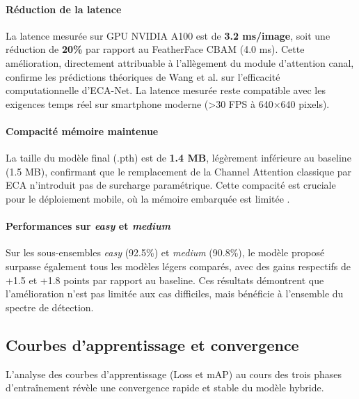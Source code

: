 \begin{onehalfspace}
\paragraph{Réduction de la latence}

\hspace{0.65 cm}La latence mesurée sur GPU NVIDIA A100 est de \textbf{3.2 ms/image}, soit une réduction de \textbf{20\%} par rapport au FeatherFace CBAM (4.0 ms). Cette amélioration, directement attribuable à l'allègement du module d'attention canal, confirme les prédictions théoriques de Wang et al. \cite{Wang2020ECANet} sur l'efficacité computationnelle d'ECA-Net. La latence mesurée reste compatible avec les exigences temps réel sur smartphone moderne (>30 FPS à 640×640 pixels).

\paragraph{Compacité mémoire maintenue}

\hspace{0.65 cm}La taille du modèle final (.pth) est de \textbf{1.4 MB}, légèrement inférieure au baseline (1.5 MB), confirmant que le remplacement de la Channel Attention classique par ECA n'introduit pas de surcharge paramétrique. Cette compacité est cruciale pour le déploiement mobile, où la mémoire embarquée est limitée \cite{Zhang2019BlazeFace}.

\paragraph{Performances sur \textit{easy} et \textit{medium}}

\hspace{0.65 cm}Sur les sous-ensembles \textit{easy} (92.5\%) et \textit{medium} (90.8\%), le modèle proposé surpasse également tous les modèles légers comparés, avec des gains respectifs de +1.5 et +1.8 points par rapport au baseline. Ces résultats démontrent que l'amélioration n'est pas limitée aux cas difficiles, mais bénéficie à l'ensemble du spectre de détection.

\subsection{Courbes d'apprentissage et convergence}

\hspace{0.65 cm}L'analyse des courbes d'apprentissage (Loss et mAP) au cours des trois phases d'entraînement révèle une convergence rapide et stable du modèle hybride.


\end{onehalfspace}
